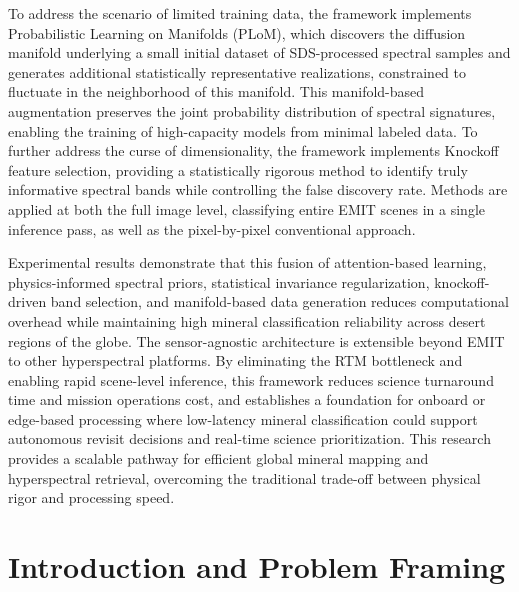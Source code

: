 \documentclass[11pt]{report}
\begin{document}
To address the scenario of limited training data, the framework implements Probabilistic Learning on Manifolds (PLoM), which discovers the diffusion manifold underlying a small initial dataset of SDS-processed spectral samples and generates additional statistically representative realizations, constrained to fluctuate in the neighborhood of this manifold. This manifold-based augmentation preserves the joint probability distribution of spectral signatures, enabling the training of high-capacity models from minimal labeled data. To further address the curse of dimensionality, the framework implements Knockoff feature selection, providing a statistically rigorous method to identify truly informative spectral bands while controlling the false discovery rate. Methods are applied at both the full image level, classifying entire EMIT scenes in a single inference pass, as well as the pixel-by-pixel conventional approach.

Experimental results demonstrate that this fusion of attention-based learning, physics-informed spectral priors, statistical invariance regularization, knockoff-driven band selection, and manifold-based data generation reduces computational overhead while maintaining high mineral classification reliability across desert regions of the globe. The sensor-agnostic architecture is extensible beyond EMIT to other hyperspectral platforms. By eliminating the RTM bottleneck and enabling rapid scene-level inference, this framework reduces science turnaround time and mission operations cost, and establishes a foundation for onboard or edge-based processing where low-latency mineral classification could support autonomous revisit decisions and real-time science prioritization. This research provides a scalable pathway for efficient global mineral mapping and hyperspectral retrieval, overcoming the traditional trade-off between physical rigor and processing speed.

\newpage


\chapter{Introduction and Problem Framing}
\label{chap:intro}
\end{document}

